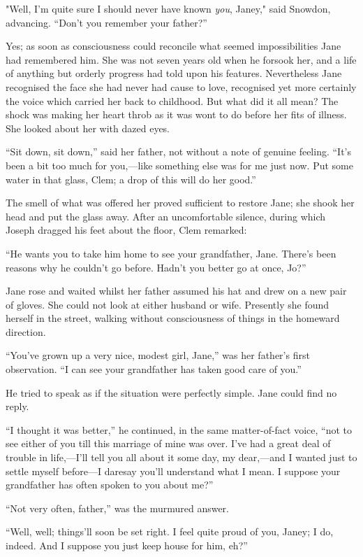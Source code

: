 "Well, I'm quite sure I should never have known \emph{you}, Janey," said
Snowdon, advancing. ``Don't you remember your father?''

{}Yes; as soon as consciousness could reconcile what seemed
impossibilities Jane had remembered him. She was not seven years old
when he forsook her, and a life of anything but orderly progress had
told upon his features. Nevertheless Jane recognised the face she had
never had cause to love, recognised yet more certainly the voice which
carried her back to childhood. But what did it all mean? The shock was
making her heart throb as it was wont to do before her fits of illness.
She looked about her with dazed eyes.

``Sit down, sit down,'' said her father, not without a note of genuine
feeling. ``It's been a bit too much for you,---like something else was
for me just now. Put some water in that glass, Clem; a drop of this will
do her good.''

The smell of what was offered her proved sufficient to restore Jane; she
shook her head and put the glass away. After an uncomfortable silence,
during which Joseph dragged his feet about the floor, Clem remarked:

{}``He wants you to take him home to see your grandfather, Jane. There's
been reasons why he couldn't go before. Hadn't you better go at once,
Jo?''

Jane rose and waited whilst her father assumed his hat and drew on a new
pair of gloves. She could not look at either husband or wife. Presently
she found herself in the street, walking without consciousness of things
in the homeward direction.

``You've grown up a very nice, modest girl, Jane,'' was her father's
first observation. ``I can see your grandfather has taken good care of
you.''

He tried to speak as if the situation were perfectly simple. Jane could
find no reply.

``I thought it was better,'' he continued, in the same matter-of-fact
voice, ``not to see either of you till this marriage of mine was over.
I've had a great deal of trouble in life,---I'll tell you all about it
some day, my dear,---and I wanted just to settle myself before---I
daresay you'll understand what I mean. I {}suppose your grandfather has
often spoken to you about me?''

``Not very often, father,'' was the murmured answer.

``Well, well; things'll soon be set right. I feel quite proud of you,
Janey; I do, indeed. And I suppose you just keep house for him, eh?''

